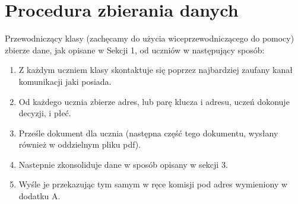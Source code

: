\section{Procedura zbierania danych}

Przewodniczący klasy (zachęcamy do użycia wiceprzewodniczącego do pomocy) zbierze dane, jak opisane w Sekcji 1, od uczniów w następujący sposób:

\begin{enumerate}[label=(\arabic*)]%
  \item Z każdym uczniem klasy skontaktuje się poprzez najbardziej zaufany kanał komunikacji jaki posiada.
  \item Od każdego ucznia zbierze adres, lub parę klucza i adresu, uczeń dokonuje decyzji, i płeć.
  \item Prześle dokument dla ucznia (następna część tego dokumentu, wysłany również w oddzielnym pliku pdf).
  \item Nastepnie zkonsoliduje dane w sposób opisany w sekcji 3.
  \item Wyśle je przekazując tym samym w ręce komisji pod adres wymieniony w dodatku A.
\end{enumerate}
